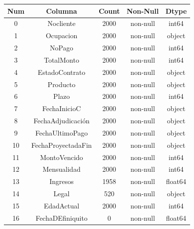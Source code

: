     \begin{table}[H]
        \centering
        \begin{tabular}{|c|c|c|c|c|}
            \hline
            \rowcolor{softblue} %
            \textbf{Num} & \textbf{Columna} & \textbf{Count} & \textbf{Non-Null} & \textbf{Dtype} \\
            \hline
            \hline
            0 &	Nocliente &		2000 &	non-null &	int64  \\
            \hline
            1 &	Ocupacion &		2000 &	non-null &	object \\
            \hline
            2 &  NoPago    &          2000 & non-null &  int64  \\
            \hline
            3 &  TotalMonto  &        2000 & non-null &  int64  \\
            \hline
            4 &  EstadoContrato &     2000 & non-null &  object \\
            \hline
            5 &   Producto  &         2000 & non-null &   object \\
            \hline
            6 &  Plazo     &          2000 & non-null &   int64  \\
            \hline
            7 &  FechaInicioC  &      2000 & non-null &   object \\
            \hline
            8 &  FechaAdjudicación &   2000 & non-null &   object \\
            \hline
            9 &   FechaUltimoPago &     2000 & non-null &   object \\
            \hline
            10 &  FechaProyectadaFin &  2000 & non-null &   object \\
            \hline
            11 &  MontoVencido &        2000 & non-null &   int64  \\
            \hline
            12 &  Mensualidad &         2000 & non-null &   int64  \\
            \hline
            \rowcolor{mediumgray}
            13 &  Ingresos &            1958 & non-null &   float64 \\
            \hline
            \rowcolor{mediumgray}
            14 &  Legal &               520 & non-null &    object \\
            \hline
            15 &  EdadActual &          2000 & non-null &   int64  \\
            \hline
            \rowcolor{mediumgray}
            16 &  FechaDEfiniquito &    0 & non-null &      float64 \\

\end{tabular}
\end{table}
